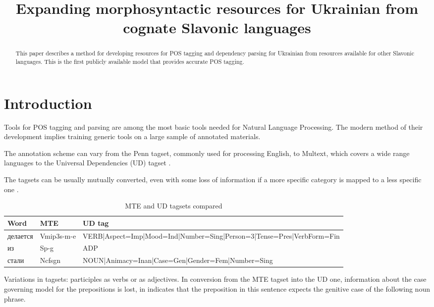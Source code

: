 \documentclass[11pt]{article}
\title{Expanding morphosyntactic resources for Ukrainian from cognate Slavonic languages}
\author{
}
\date{}
\renewcommand{\R}[1]{{\fontfamily{iwonac}\foreignlanguage{russian}{#1}}}
\begin{document}
\maketitle

\begin{abstract}
  This paper describes a method for developing resources for POS tagging and dependency parsing for Ukrainian from resources available for other Slavonic languages.
  This is the first publicly available model that provides accurate POS tagging.
\end{abstract}


\section{Introduction}
Tools for POS tagging and parsing are among the most basic tools needed for Natural Language Processing.  The modern method of their development implies training generic tools on a large sample of annotated materials.

The annotation scheme can vary from the Penn tagset, commonly used for processing English, to Multext, which covers a wide range languages \cite{erjavec10} to the Universal Dependencies (UD) tagset \cite{nivre16}.


The tagsets can be usually mutually converted, even with some loss of information if a more specific category is mapped to a less specific one \cite{zeman08}.

\begin{table*}
\begin{tabular}{lll}
\textbf{Word}	& \textbf{MTE}	& \textbf{UD tag}\\\hline
\R{делается}	& Vmip3s-m-e	& VERB|Aspect=Imp|Mood=Ind|Number=Sing|Person=3|Tense=Pres|VerbForm=Fin\\
\R{из}		& Sp-g  	& ADP\\
\R{стали}	& Ncfsgn	& NOUN|Animacy=Inan|Case=Gen|Gender=Fem|Number=Sing\\
\end{tabular}
\caption{MTE and UD tagsets compared}
\label{tabAnnotationExample}
\end{table*}

Variations in tagsets: participles as verbs or as adjectives.  In conversion from the MTE tagset into the UD one, information about the case governing model for the prepositions is lost,  in  indicates that the preposition in this sentence expects the genitive case of the following noun phrase.
\end{document}
